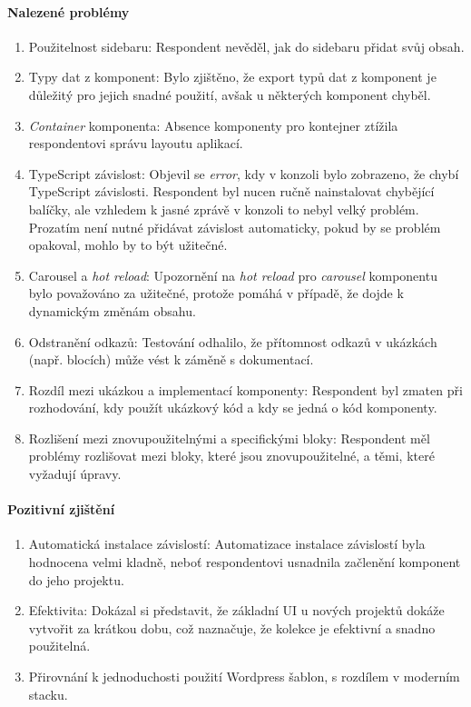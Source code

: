 \paragraph{Nalezené problémy}
\begin{enumerate}
  \item Použitelnost sidebaru: Respondent nevěděl, jak do sidebaru přidat svůj obsah.
  \item Typy dat z komponent: Bylo zjištěno, že export typů dat z komponent je důležitý pro jejich snadné použití, avšak u některých komponent chyběl.
  \item \emph{Container} komponenta: Absence komponenty pro kontejner ztížila respondentovi správu layoutu aplikací.
  \item TypeScript závislost: Objevil se \emph{error}, kdy v konzoli bylo zobrazeno, že chybí TypeScript závislosti. Respondent byl nucen ručně nainstalovat chybějící balíčky, ale vzhledem k jasné zprávě v konzoli to nebyl velký problém. Prozatím není nutné přidávat závislost automaticky, pokud by se problém opakoval, mohlo by to být užitečné.
  \item Carousel a \emph{hot reload}: Upozornění na \emph{hot reload} pro \emph{carousel} komponentu bylo považováno za užitečné, protože pomáhá v případě, že dojde k dynamickým změnám obsahu.
  \item Odstranění odkazů: Testování odhalilo, že přítomnost odkazů v ukázkách (např. blocích) může vést k záměně s dokumentací.
  \item Rozdíl mezi ukázkou a implementací komponenty: Respondent byl zmaten při rozhodování, kdy použít ukázkový kód a kdy se jedná o kód komponenty.
  \item Rozlišení mezi znovupoužitelnými a specifickými bloky: Respondent měl problémy rozlišovat mezi bloky, které jsou znovupoužitelné, a těmi, které vyžadují úpravy.
\end{enumerate}

\paragraph{Pozitivní zjištění}
\begin{enumerate}
  \item Automatická instalace závislostí: Automatizace instalace závislostí byla hodnocena velmi kladně, neboť respondentovi usnadnila začlenění komponent do jeho projektu.
  \item Efektivita: Dokázal si představit, že základní UI u nových projektů dokáže vytvořit za krátkou dobu, což naznačuje, že kolekce je efektivní a snadno použitelná.
  \item Přirovnání k jednoduchosti použití Wordpress šablon, s rozdílem v moderním stacku.
\end{enumerate}

